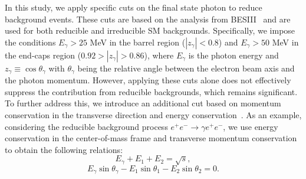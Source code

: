\documentclass[preprint, superscriptaddress,amsmath, nofootinbib]{revtex4-1}
\begin{document}
In this study, we apply specific cuts on the final state photon to reduce background events. These cuts are based on the analysis from BESIII~\cite{PhysRevD.96.112008} and are used for both reducible and irreducible SM backgrounds. Specifically, we impose the conditions $E_{\gamma} > 25$ MeV in the barrel region ($|z_{\gamma}| < 0.8$) and $E_{\gamma} > 50$ MeV in the end-caps region ($0.92 > |z_{\gamma}| > 0.86$), where $E_{\gamma}$ is the photon energy and $z_{\gamma} \equiv \cos{\theta_{\gamma}}$ with $\theta_{\gamma}$ being the relative angle between the electron beam axis and the photon momentum. However, applying these cuts alone does not effectively suppress the contribution from reducible backgrounds, which remains significant. To further address this, we introduce an additional cut based on momentum conservation in the transverse direction and energy conservation~\cite{PhysRevD.100.115016, Liu:2019ogn,Zhang:2019wnz}. As an example, considering the reducible background process $e^{+}e^{-} \rightarrow \gamma e^{+}e^{-}$, we use energy conservation in the center-of-mass frame and transverse momentum conservation to obtain the following relations:
\begin{equation}
     E_{\gamma} + E_{1} + E_{2} = \sqrt{s}, 
\end{equation}       
\begin{equation}
E_{\gamma}\sin{\theta_{\gamma}} - E_{1}\sin{\theta_{1}} - E_{2}\sin{\theta_{2}}= 0.
\end{equation}
\end{document}
